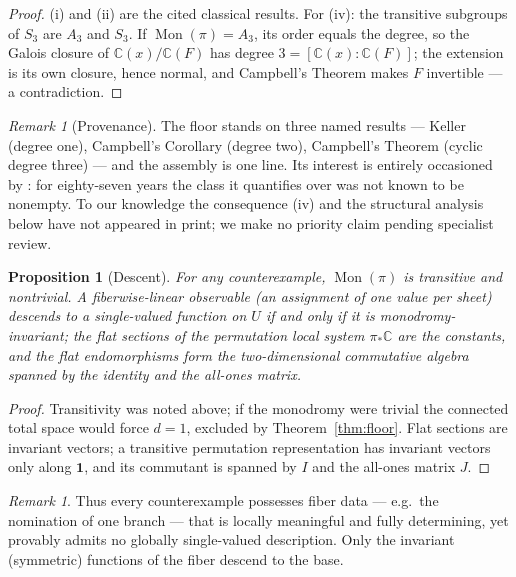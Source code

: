 \documentclass[11pt,reqno]{amsart}
\numberwithin{equation}{section}
\newtheorem{proposition}[theorem]{Proposition}
\theoremstyle{remark}
\newtheorem{remark}[theorem]{Remark}
\newcommand{\C}{\mathbb C}
\DeclareMathOperator{\Mon}{Mon}
\begin{document}
\begin{proof}
(i) and (ii) are the cited classical results. For (iv): the transitive
subgroups of $S_3$ are $A_3$ and $S_3$. If $\Mon(\pi)=A_3$, its order
equals the degree, so the Galois closure of $\C(x)/\C(F)$ has degree
$3=[\C(x):\C(F)]$; the extension is its own closure, hence normal, and
Campbell's Theorem makes $F$ invertible --- a contradiction.
\end{proof}

\begin{remark}[Provenance]\label{rem:provenance-floor}
The floor stands on three named results --- Keller (degree one), Campbell's
Corollary (degree two), Campbell's Theorem (cyclic degree three) --- and
the assembly is one line. Its interest is entirely occasioned by
\cite{Alpoge}: for eighty-seven years the class it quantifies over was not
known to be nonempty. To our knowledge the consequence
(iv) and the structural analysis below have not appeared in print; we make
no priority claim pending specialist review.
\end{remark}

\begin{proposition}[Descent]\label{prop:descent}
For any counterexample, $\Mon(\pi)$ is transitive and nontrivial. A
fiberwise-linear observable (an assignment of one value per sheet) descends
to a single-valued function on $U$ if and only if it is
monodromy-invariant; the flat sections of the permutation local system
$\pi_*\C$ are the constants, and the flat endomorphisms form the
two-dimensional commutative algebra spanned by the identity and the
all-ones matrix.
\end{proposition}

\begin{proof}
Transitivity was noted above; if the monodromy were trivial the connected
total space would force $d=1$, excluded by Theorem~\ref{thm:floor}. Flat
sections are invariant vectors; a transitive permutation representation has
invariant vectors only along $\mathbf 1$, and its commutant is spanned by
$I$ and the all-ones matrix $J$.
\end{proof}

\begin{remark}\label{rem:preobservable}
Thus every counterexample possesses fiber data --- e.g.\ the nomination of
one branch --- that is locally meaningful and fully determining, yet
provably admits no globally single-valued description. Only the invariant
(symmetric) functions of the fiber descend to the base.
\end{remark}
\end{document}
